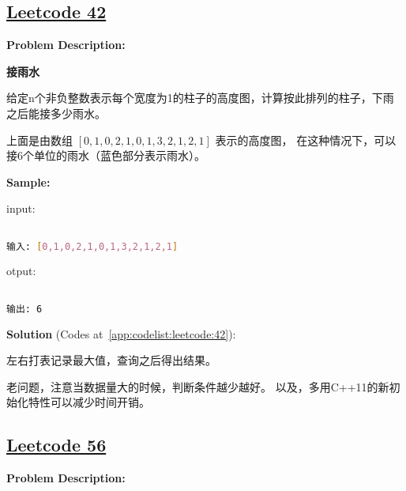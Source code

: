 \subsection{\href{https://leetcode-cn.com/}{Leetcode 42}}\label{app:problemlist:leetcode:42}

\textbf{Problem Description:}\par

\textbf{接雨水}\par

给定n个非负整数表示每个宽度为1的柱子的高度图，计算按此排列的柱子，下雨之后能接多少雨水。\par

上面是由数组 $ [0,1,0,2,1,0,1,3,2,1,2,1] $ 表示的高度图，
在这种情况下，可以接6个单位的雨水（蓝色部分表示雨水）。\par


\textbf{Sample:}\par

input:\par

\begin{lstlisting}[language=bash]

输入: [0,1,0,2,1,0,1,3,2,1,2,1]


\end{lstlisting}

otput:\par

\begin{lstlisting}[language=bash]

输出: 6


\end{lstlisting}

\textbf{Solution }(Codes at~\ref{app:codelist:leetcode:42}):\par

左右打表记录最大值，查询之后得出结果。\par

老问题，注意当数据量大的时候，判断条件越少越好。
以及，多用C++11的新初始化特性可以减少时间开销。\par



\subsection{\href{https://leetcode-cn.com/}{Leetcode 56}}\label{app:problemlist:leetcode:56}

\textbf{Problem Description:}\par

